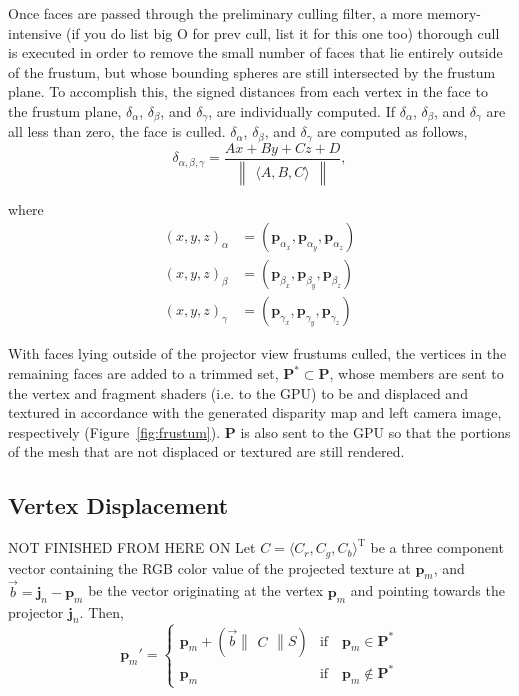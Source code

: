 \documentclass[a4paper,twoside]{article}
\begin{document}
Once faces are passed through the preliminary culling filter, a more memory-intensive (if you do list big O for prev cull, list it for this one too) thorough cull is executed in order to remove the small number of faces that lie entirely outside of the frustum, but whose bounding spheres are still intersected by the frustum plane.  To accomplish this, the signed distances from each vertex in the face to the frustum plane, $\delta_{\alpha}$, $\delta_{\beta}$, and $\delta_{\gamma}$, are individually computed. If $\delta_{\alpha}$, $\delta_{\beta}$, and $\delta_{\gamma}$ are all less than zero, the face is culled. $\delta_{\alpha}$, $\delta_{\beta}$, and $\delta_{\gamma}$ are computed as follows,
%
\begin{equation} %
\delta_{\alpha, \beta, \gamma} = \frac{Ax + By + Cz + D}{\begin{Vmatrix} \langle A, B, C \rangle \end{Vmatrix}},
\end{equation}

where
\begin{align}
\nonumber
(x, y, z)_{\alpha} &= (\mathbf{p}_{\alpha_{x}}, \mathbf{p}_{\alpha_{y}}, \mathbf{p}_{\alpha_{z}})\\
\nonumber
(x, y, z)_{\beta} &= (\mathbf{p}_{\beta_{x}}, \mathbf{p}_{\beta_{y}}, \mathbf{p}_{\beta_{z}})\\
(x, y, z)_{\gamma} &= (\mathbf{p}_{\gamma_{x}}, \mathbf{p}_{\gamma_{y}}, \mathbf{p}_{\gamma_{z}})
\end{align}


With faces lying outside of the projector view frustums culled, the vertices in the remaining faces are added to a trimmed set, $\mathbf{P}^{*}\subset \mathbf{P}$, whose members are sent to the vertex and fragment shaders (i.e. to the GPU) to be and displaced and textured in accordance with the generated disparity map and left camera image, respectively (Figure~\ref{fig:frustum}). $\mathbf{P}$ is also sent to the GPU so that the portions of the mesh that are not displaced or textured are still rendered.

\subsection{Vertex Displacement}

NOT FINISHED FROM HERE ON
 Let $C = \langle C_{r},C_{g},C_{b}\rangle ^\mathrm{T}$ be a three component vector containing the RGB color value of the projected texture at $\mathbf{p}_{m}$, and $\vec{b} = \mathbf{j}_{n} - \mathbf{p}_{m}$ be the vector originating at the vertex $\mathbf{p}_{m}$ and pointing towards the projector $\mathbf{j}_{n}$. Then,
\begin{equation}
\mathbf{p}_{m}' = \left \{ 
\begin{array}{ll}
\mathbf{p}_{m} + (\vec{b} \begin{Vmatrix}C\end{Vmatrix} S) & \text{if} \quad \mathbf{p}_{m} \in \mathbf{P}^{*}\\
\mathbf{p}_{m} & \text{if} \quad \mathbf{p}_{m} \notin \mathbf{P}^{*}
\end{array}\right.
\label{eq:displace}
\end{equation}
\end{document}
